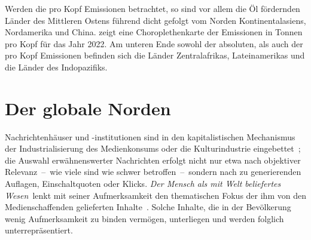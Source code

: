 {%
\vspace{\baselineskip}
\centering

\label{fig:ghg per kopf}
\vspace{\baselineskip}
}

Werden die pro Kopf Emissionen betrachtet, so sind vor allem die Öl fördernden Länder des Mittleren Ostens führend dicht gefolgt vom Norden Kontinentalasiens, Nordamerika und China.
 zeigt eine Choroplethenkarte der Emissionen in Tonnen pro Kopf für das Jahr 2022.
Am unteren Ende sowohl der absoluten, als auch der pro Kopf Emissionen befinden sich die Länder Zentralafrikas, Lateinamerikas und die Länder des Indopazifiks.
%
\section{Der globale Norden}

\cite{Misc.ReitisMuenstermann.MonitoringClimateChangeAndCOP28InEuropeanOnlineNewsMedia.2024}

Nachrichtenhäuser und -institutionen sind in den kapitalistischen Mechanismus der Industrialisierung des Medienkonsums oder die Kulturindustrie eingebettet~\cite{Book.Horkheimer.Kulturindustrie.2024}; die Auswahl erwähnenswerter Nachrichten erfolgt nicht nur etwa nach objektiver Relevanz~--~wie viele sind wie schwer betroffen~--~sondern nach zu generierenden Auflagen, Einschaltquoten oder Klicks.
\textit{\glqq Der Mensch als mit Welt beliefertes Wesen\grqq}~lenkt mit seiner Aufmerksamkeit den thematischen Fokus der ihm von den Medienschaffenden gelieferten Inhalte~\cite{InCollection.Anders.DieWeltAlsPhantomUndMatrize.2019}.
Solche Inhalte, die in der Bevölkerung wenig Aufmerksamkeit zu binden vermögen, unterliegen und werden folglich unterrepräsentiert.

